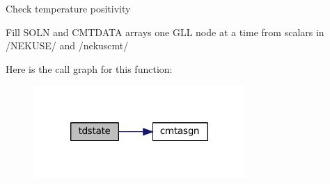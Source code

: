 Check temperature positivity

Fill S\-O\-L\-N and C\-M\-T\-D\-A\-T\-A arrays one G\-L\-L node at a time from scalars in /\-N\-E\-K\-U\-S\-E/ and /nekuscmt/

Here is the call graph for this function\-:\nopagebreak
\begin{figure}[H]
\begin{center}
\leavevmode
\includegraphics[width=228pt]{group__state_ga91fd597ad604e7412e8d78a79beefe34_cgraph}
\end{center}
\end{figure}


